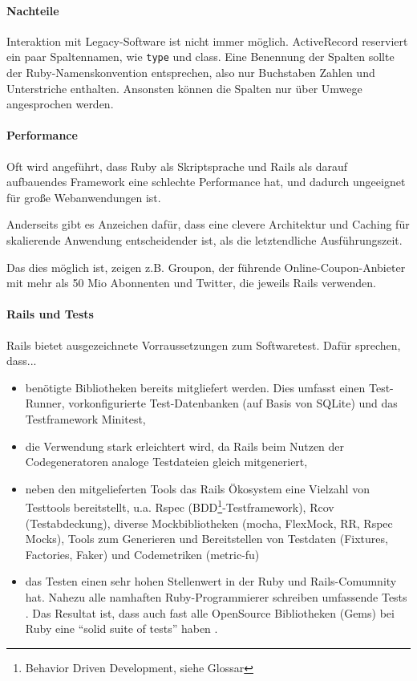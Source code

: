 
\paragraph{Nachteile}
Interaktion mit Legacy-Software ist nicht immer möglich. ActiveRecord reserviert ein paar Spaltennamen, wie \texttt{type} und  class. Eine Benennung der Spalten sollte der Ruby-Namenskonvention entsprechen, also nur Buchstaben Zahlen und Unterstriche enthalten. Ansonsten können die Spalten nur über Umwege angesprochen werden.

\paragraph{Performance} Oft wird angeführt, dass Ruby als Skriptsprache und Rails als darauf aufbauendes Framework eine schlechte Performance hat, und dadurch ungeeignet für große Webanwendungen ist.


Anderseits gibt es Anzeichen dafür, dass eine clevere Architektur und Caching für skalierende Anwendung entscheidender ist, als die letztendliche Ausführungszeit.

Das dies möglich ist, zeigen z.B. Groupon, der führende Online-Coupon-Anbieter mit mehr als 50 Mio Abonnenten und 
Twitter, die jeweils Rails verwenden.

\paragraph{Rails und Tests}
Rails bietet ausgezeichnete Vorraussetzungen zum Softwaretest. Dafür sprechen, dass...

\begin{itemize}
 \item benötigte Bibliotheken bereits mitgliefert werden. Dies umfasst einen Test-Runner, vorkonfigurierte Test-Datenbanken (auf Basis von SQLite) und das Testframework Minitest,
 \item die Verwendung stark erleichtert wird, da Rails beim Nutzen der Codegeneratoren analoge Testdateien gleich mitgeneriert,
 \item neben den mitgelieferten Tools das Rails Ökosystem eine Vielzahl von Testtools bereitstellt, u.a. Rspec (BDD\footnote{Behavior Driven Development, siehe Glossar}-Testframework), Rcov (Testabdeckung), diverse Mockbibliotheken (mocha, FlexMock, RR, Rspec Mocks), Tools zum Generieren und Bereitstellen von Testdaten (Fixtures, Factories, Faker) und Codemetriken (metric-fu)
 \item das Testen einen sehr hohen Stellenwert in der Ruby und Rails-Comumnity hat. Nahezu alle namhaften Ruby-Programmierer schreiben umfassende Tests \citep{devries_rails_2008}. Das Resultat ist, dass auch fast alle OpenSource Bibliotheken (Gems) bei Ruby eine "`solid suite of tests"' haben \citep{devries_rails_2008}. 
\end{itemize}

